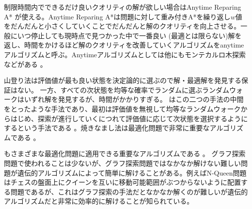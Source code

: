 制限時間内でできるだけ良いクオリティの解が欲しい場合はAnytime Reparing A* \cite{likhachev2004ara}が使える。Anytime Reparing A*は問題に対して重み付きA*を繰り返し$w$値をだんだんと小さくしていくことでだんだんと解のクオリティを向上させる。一般にいつ停止しても現時点で見つかった中で一番良い (最適とは限らない)解を返し、時間をかけるほど解のクオリティを改善していくアルゴリズムをanytimeアルゴリズムと呼ぶ。Anytimeアルゴリズムとしては他にもモンテカルロ木探索などがある \cite{browne2012survey}。

山登り法は評価値が最も良い状態を決定論的に選ぶので解・最適解を発見する保証はない。
一方、すべての次状態を均等な確率でランダムに選ぶランダムウォークはいずれ解を発見するが、時間がかかりすぎる。
はこの二つの手法の中間をとったような手法であり、最初は評価値を無視して均等なランダムウォークからはじめ、探索が進行していくにつれて評価値に応じて次状態を選択するようにするという手法である \cite{vcerny1985thermodynamical,van1987simulated}。焼きなまし法は最適化問題で非常に重要なアルゴリズムである \cite{kirkpatrick1983optimization}。

もさまざまな最適化問題に適用できる重要なアルゴリズムである \cite{goldberg1989}。
グラフ探索問題で使われることは少ないが、グラフ探索問題ではなかなか解けない難しい問題が遺伝的アルゴリズムによって簡単に解けることがある。例えばN-Queen問題はチェスの盤面上にクイーンを互いに移動可能範囲がぶつからないように配置する問題であるが、これはグラフ探索の手法だとなかなか解くのが難しいが遺伝的アルゴリズムだと非常に効率的に解けることが知られている。
